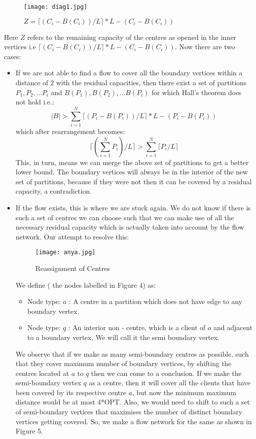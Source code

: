 \documentclass[12pt,a4paper,onecolumn]{article}
\begin{document}
\begin{center}
\begin{figure}[H]
\texttt{[image: diag1.jpg]}
\caption{$Z=\lceil (C_i-B(C_i))/L\rceil*L-(C_i-B(C_i))$}
\end{figure}
\end{center}
Here $Z$ refers to the remaining capacity of the centres as opened in the inner vertices i.e $\lceil (C_i-B(C_i))/L\rceil*L-(C_i-B(C_i))$.
Now there are two cases:
\begin{itemize}
\item If we are not able to find a flow to cover all the boundary vertices within a distance of 2 with the residual capacities, then there exist a set of partitions $P_1, P_2,\ldots P_i$ and $B(P_1), B(P_2),\ldots B(P_i)$ for which Hall’s theorem does not hold i.e.: 
 $$|B|> {\sum_{i=1}^{N}\lceil (P_i-B(P_i))/L\rceil*L-(P_i-B(P_i))}$$
which after rearrangement becomes:\\
$$\lceil (\sum_{i=1}^{N}P_i)/L \rceil > \sum_{i=1}^{N} \lceil P_i/L \rceil   $$
This, in turn, means we can merge the above set of partitions to get a better lower bound. The boundary vertices will always be in the interior of the new set of partitions, because if they were not then it can be covered by a residual capacity, a contradiction.



\item If the flow exists, this is where we are stuck again. We do not know if there is such a set of centres we can choose such that we can make use of all the necessary residual capacity which is actually taken into account by the flow network. 
Our attempt to resolve this:

\begin{flushleft}
\begin{figure}[H]
\texttt{[image: anya.jpg]}
  
  \caption{Reassignment of Centres}
\end{figure}
\end{flushleft}

We define ( the nodes labelled in Figure 4) as:
\begin{itemize}


\item Node type: $a$ : A centre in a partition which does not have edge to any boundary vertex.
\item Node type: $q$ : An interior non - centre, which is a client of $a$ and adjacent to a boundary vertex. We will call it the semi boundary vertex. 
\end{itemize} 
We observe that if we make as many semi-boundary centres as possible, such that they cover maximum number of boundary vertices, by shifting the centres located at $a$ to $q$ then we can come to a conclusion. 
If we make the semi-boundary vertex $q$ as a centre, then it will cover all the clients that have been covered by its respective centre $a$, but now the minimum maximum distance would be at most 4*OPT. Also, we would need to shift to such a set of semi-boundary vertices that maximises the number of distinct boundary vertices getting covered. So, we make a flow network for the same as shown in Figure 5.


\end{itemize}
\end{document}
